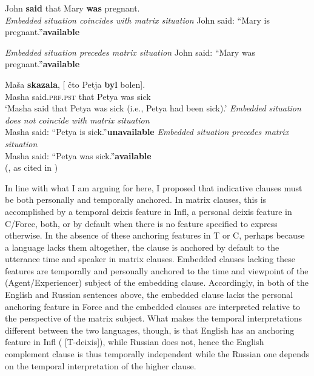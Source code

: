 \documentclass[output=paper,
modfonts,
newtxmath,
hidelinks,
]{langscibook}
\begin{document}
\ea \label{ex31}
	John \textbf{said} that Mary \textbf{was} pregnant.\\
	\ea \label{ex31a}
    \textit{Embedded situation coincides with matrix situation}
    \newline John said: “Mary is pregnant.”\hfill\textbf{available}
    
	\ex \label{ex31b}
    \textit{Embedded situation precedes matrix situation}
    \newline John said: “Mary was pregnant.”\hfill\textbf{available}
    
	\z
\z

\ea \label{ex32}
\gll Maša \textbf{skazala}, [\hspace{-2pt} čto Petja \textbf{byl} bolen].\\
    Masha said.\textsc{prf.pst} {} that Petya was sick\\
\glt `Masha said that Petya was sick (i.e., Petya had been sick).'
\ea \textit{Embedded situation does not coincide with matrix situation}\\
      Masha said: “Petya is sick.”\hfill\textbf{unavailable}
\ex      \textit{Embedded situation precedes matrix situation}\\
	Masha said: “Petya was sick.”\hfill\textbf{available}\\\hfill (\citealt[183]{Kondrashova1999}, as cited in \citealt[174]{Mezhevich2006})
\z\z

\noindent In line with what I am arguing for here, I proposed that indicative clauses must be both personally and temporally anchored. In matrix clauses, this is accomplished by a temporal deixis feature in Infl, a personal deixis feature in C/Force, both, or by default when there is no feature specified to express otherwise. In the absence of these anchoring features in T or C, perhaps because a language lacks them altogether, the clause is anchored by default to the utterance time and speaker in matrix clauses. Embedded clauses lacking these features are temporally and personally anchored to the time and viewpoint of the (Agent/Experiencer) subject of the embedding clause. Accordingly, in both of the English and Russian sentences above, the embedded clause lacks the personal anchoring feature in Force and the embedded clauses are interpreted relative to the perspective of the matrix subject. What makes the temporal interpretations different between the two languages, though, is that English has an anchoring feature in Infl ( [T-deixis]), while Russian does not, hence the English complement clause is thus temporally independent while the Russian one depends on the temporal interpretation of the higher clause.
\end{document}
